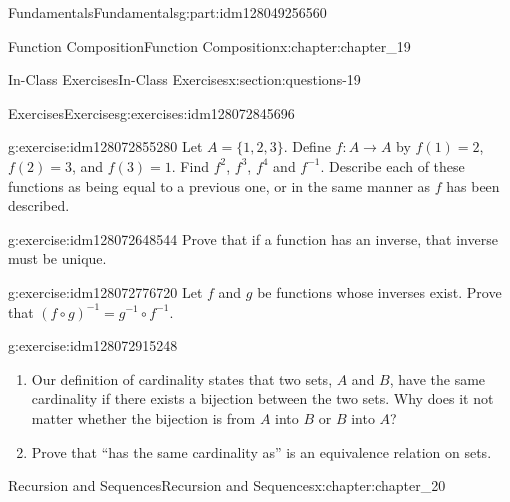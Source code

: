 \documentclass[oneside,10pt,]{book}
\numberwithin{equation}{section}
\begin{document}
\begin{partptx}{Fundamentals}{}{Fundamentals}{}{}{g:part:idm128049256560}
\begin{chapterptx}{Function Composition}{}{Function Composition}{}{}{x:chapter:chapter_19}
\begin{sectionptx}{In-Class Exercises}{}{In-Class Exercises}{}{}{x:section:questions-19}
%
\begin{exercises-subsection}{Exercises}{}{Exercises}{}{}{g:exercises:idm128072845696}
\par\medskip\noindent%
%
\begin{exercisegroup}
\begin{divisionexerciseeg}{1}{}{}{g:exercise:idm128072855280}%
Let \(A = \{1, 2, 3\}\). Define \(f:A\rightarrow A\) by \(f(1) = 2\), \(f(2) = 3\), and \(f(3) = 1\). Find \(f^2\), \(f^3\), \(f^4\) and \(f^{-1}\).  Describe each of these functions as being equal to a previous one, or in the same manner as \(f\) has been described.%
\end{divisionexerciseeg}%
\begin{divisionexerciseeg}{2}{}{}{g:exercise:idm128072648544}%
Prove that if a function has an inverse, that inverse must be unique.%
\end{divisionexerciseeg}%
\begin{divisionexerciseeg}{3}{}{}{g:exercise:idm128072776720}%
Let \(f\) and \(g\) be functions whose inverses exist. Prove that \((f\circ g)^{-1}= g^{-1}\circ f^{-1}\).%
\end{divisionexerciseeg}%
\begin{divisionexerciseeg}{4}{}{}{g:exercise:idm128072915248}%
%
\begin{enumerate}[label=(\alph*)]
\item{}Our definition of cardinality states that two sets, \(A\) and \(B\), have the same cardinality if there exists a bijection between the two sets. Why does it not matter whether the bijection is from \(A\) into \(B\) or \(B\) into \(A\)?%
\item{}Prove that ``has the same cardinality as'' is an equivalence relation on sets.%
\end{enumerate}
%
\end{divisionexerciseeg}%
\end{exercisegroup}
\par\medskip\noindent
\end{exercises-subsection}
\end{sectionptx}
\end{chapterptx}
%
\typeout{************************************************}
\typeout{************************************************}
%
\begin{chapterptx}{Recursion and Sequences}{}{Recursion and Sequences}{}{}{x:chapter:chapter_20}
%
%
%
%
\typeout{************************************************}

\end{chapterptx}
\end{partptx}
\end{document}
